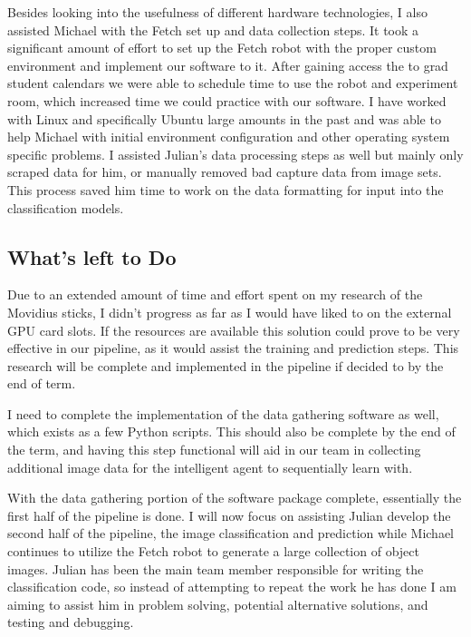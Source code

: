 \documentclass[draftclsnofoot, onecolumn, 10pt, compsoc]{IEEEtran}
\begin{document}
Besides looking into the usefulness of different hardware technologies, I also assisted Michael with the Fetch set up and data collection steps. It took a significant amount of effort to set up the Fetch robot with the proper custom environment and implement our software to it. After gaining access the to grad student calendars we were able to schedule time to use the robot and experiment room, which increased time we could practice with our software. I have worked with Linux and specifically Ubuntu large amounts in the past and was able to help Michael with initial environment configuration and other operating system specific problems. I assisted Julian's data processing steps as well but mainly only scraped data for him, or manually removed bad capture data from image sets. This process saved him time to work on the data formatting for input into the classification models. 

\subsection{What’s left to Do}  

Due to an extended amount of time and effort spent on my research of the Movidius sticks, I didn’t progress as far as I would have liked to on the external GPU card slots. If the resources are available this solution could prove to be very effective in our pipeline, as it would assist the training and prediction steps. This research will be complete and implemented in the pipeline if decided to by the end of term. 

I need to complete the implementation of the data gathering software as well, which exists as a few Python scripts. This should also be complete by the end of the term, and having this step functional will aid in our team in collecting additional image data for the intelligent agent to sequentially learn with. 

With the data gathering portion of the software package complete, essentially the first half of the pipeline is done. I will now focus on assisting Julian develop the second half of the pipeline, the image classification and prediction while Michael continues to utilize the Fetch robot to generate a large collection of object images. Julian has been the main team member responsible for writing the classification code, so instead of attempting to repeat the work he has done I am aiming to assist him in problem solving, potential alternative solutions, and testing and debugging. 
\end{document}
